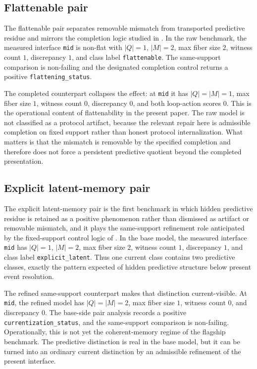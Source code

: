 \documentclass[11pt]{article}
\newcommand{\CurrentQ}{Q}
\newcommand{\PredictiveQ}{M}
\theoremstyle{definition}
\begin{document}
\subsection{Flattenable pair}\label{subsec:bench-flattenable}
The flattenable pair separates removable mismatch from transported predictive residue and mirrors the completion logic studied in \citep{Tsiokos2026FlattenStone}. In the raw benchmark, the measured interface \texttt{mid} is non-flat with $|\CurrentQ|=1$, $|\PredictiveQ|=2$, max fiber size $2$, witness count $1$, discrepancy $1$, and class label \texttt{flattenable}. The same-support comparison is non-failing and the designated completion control returns a positive \texttt{flattening\_status}.

The completed counterpart collapses the effect: at \texttt{mid} it has $|\CurrentQ|=|\PredictiveQ|=1$, max fiber size $1$, witness count $0$, discrepancy $0$, and both loop-action scores $0$. This is the operational content of flattenability in the present paper. The raw model is not classified as a protocol artifact, because the relevant repair here is admissible completion on fixed support rather than honest protocol internalization. What matters is that the mismatch is removable by the specified completion and therefore does not force a persistent predictive quotient beyond the completed presentation.

\subsection{Explicit latent-memory pair}\label{subsec:bench-explicit-latent}
The explicit latent-memory pair is the first benchmark in which hidden predictive residue is retained as a positive phenomenon rather than dismissed as artifact or removable mismatch, and it plays the same-support refinement role anticipated by the fixed-support control logic of \citep{Tsiokos2026EventPackages}. In the base model, the measured interface \texttt{mid} has $|\CurrentQ|=1$, $|\PredictiveQ|=2$, max fiber size $2$, witness count $1$, discrepancy $1$, and class label \texttt{explicit\_latent}. Thus one current class contains two predictive classes, exactly the pattern expected of hidden predictive structure below present event resolution.

The refined same-support counterpart makes that distinction current-visible. At \texttt{mid}, the refined model has $|\CurrentQ|=|\PredictiveQ|=2$, max fiber size $1$, witness count $0$, and discrepancy $0$. The base-side pair analysis records a positive \texttt{currentization\_status}, and the same-support comparison is non-failing. Operationally, this is not yet the coherent-memory regime of the flagship benchmark. The predictive distinction is real in the base model, but it can be turned into an ordinary current distinction by an admissible refinement of the present interface.
\end{document}
